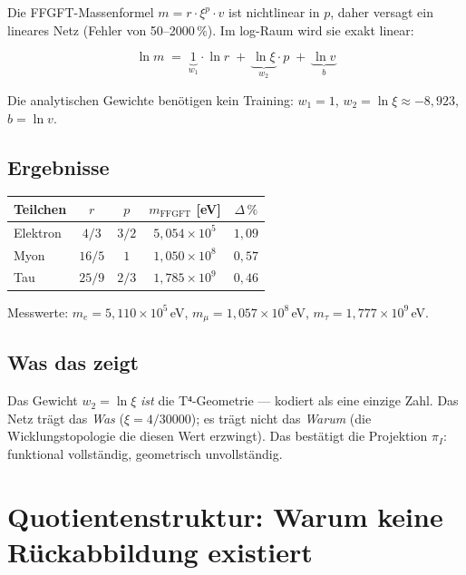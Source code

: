 Die FFGFT-Massenformel $m = r \cdot \xi^p \cdot v$ ist nichtlinear in $p$,
daher versagt ein lineares Netz (Fehler von 50--2000\,\%). Im log-Raum
wird sie exakt linear:

\begin{equation}
  \ln m \;=\; \underbrace{1}_{w_1}\cdot\ln r
           \;+\; \underbrace{\ln\xi}_{w_2}\cdot p
           \;+\; \underbrace{\ln v}_{b}
  \tag{243.11}
\end{equation}

Die analytischen Gewichte benötigen kein Training:
$w_1 = 1$, $w_2 = \ln\xi \approx -8{,}923$, $b = \ln v$.

\subsection{Ergebnisse}

\begin{center}
\renewcommand{\arraystretch}{1.3}
{\small
\begin{tabular}{lcccc}
\toprule
\textbf{Teilchen} & $r$ & $p$
  & $m_\text{FFGFT}$ [eV] & $\Delta\,\%$ \\
\midrule
Elektron & $4/3$ & $3/2$ & $5{,}054\times10^5$ & $1{,}09$ \\
Myon     & $16/5$ & $1$   & $1{,}050\times10^8$ & $0{,}57$ \\
Tau      & $25/9$ & $2/3$ & $1{,}785\times10^9$ & $0{,}46$ \\
\bottomrule
\end{tabular}
}
\end{center}

Messwerte: $m_e = 5{,}110\times10^5$\,eV,
$m_\mu = 1{,}057\times10^8$\,eV, $m_\tau = 1{,}777\times10^9$\,eV.

\subsection{Was das zeigt}

Das Gewicht $w_2 = \ln\xi$ \emph{ist} die T⁴-Geometrie --- kodiert als
eine einzige Zahl. Das Netz trägt das \emph{Was} ($\xi = 4/30000$);
es trägt nicht das \emph{Warum} (die Wicklungstopologie die diesen Wert
erzwingt). Das bestätigt die Projektion $\pi_I$: funktional vollständig,
geometrisch unvollständig.

\section{Quotienten\-struktur: Warum keine Rück\-abbildung existiert}

